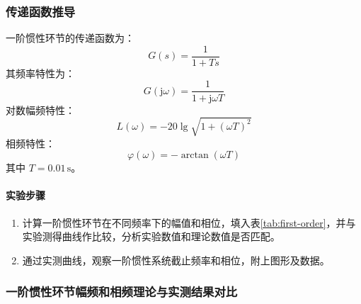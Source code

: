 \documentclass[12pt,a4paper]{article}
\begin{document}
\subsubsection{传递函数推导}
一阶惯性环节的传递函数为：
\begin{equation}
G(s) = \frac{1}{1+Ts}
\end{equation}
其频率特性为：
\begin{equation}
G(\mathrm{j}\omega) = \frac{1}{1+\mathrm{j}\omega T}
\end{equation}
对数幅频特性：
\begin{equation}
L(\omega) = -20\lg\sqrt{1+(\omega T)^2}
\end{equation}
相频特性：
\begin{equation}
\varphi(\omega) = -\arctan(\omega T)
\end{equation}
其中 $T=0.01\,\mathrm{s}$。

\paragraph{实验步骤}
\begin{enumerate}
    \item 计算一阶惯性环节在不同频率下的幅值和相位，填入表\ref{tab:first-order}，并与实验测得曲线作比较，分析实验数值和理论数值是否匹配。
    \item 通过实测曲线，观察一阶惯性系统截止频率和相位，附上图形及数据。
\end{enumerate}

\subsubsection{一阶惯性环节幅频和相频理论与实测结果对比}
\begin{table}[H]
\centering
\caption{一阶惯性环节幅频和相频理论与实测结果对比}
\label{tab:first-order}
\end{table}
\end{document}

